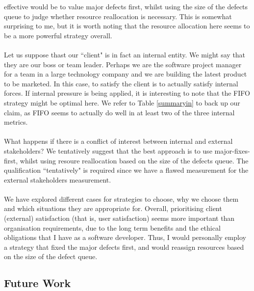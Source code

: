 effective would be to value major defects first, whilst using the size of the
defects queue to judge whether resource reallocation is necessary.
This is somewhat surprising to me, but it is worth noting that the resource
allocation here seems to be a more powerful strategy overall.\\
\\
Let us suppose thast our ``client" is in fact an internal entity.
We might say that they are our boss or team leader.
Perhaps we are the software project manager for a team in a large technology
company and we are building the latest product to be marketed.
In this case, to satisfy the client is to actually satisfy internal forces.
If internal pressure is being applied, it is interesting to note that the FIFO
strategy might be optimal here.
We refer to Table \ref{summaryin} to back up our claim, as FIFO seems to
actually do well in at least two of the three internal metrics.\\
\\
What happens if there is a conflict of interest between internal and external
stakeholders?
We tentatively suggest that the best approach is to use major-fixes-first,
   whilst using resoure reallocation based on the size of the defects queue.
The qualification ``tentatively" is required since we have a flawed measurement
for the external stakeholders measurement.\\
\\
We have explored different cases for strategies to choose, why we choose them
and which situations they are appropriate for.
Overall, prioritising client (external) satisfaction (that is, user
    satisfaction) seems more important than organisation requirements, due to
the long term benefits and the ethical obligations that I have as a software
developer.
Thus, I would personally employ a strategy that fixed the major defects first,
  and would reassign resources based on the size of the defect queue.

\subsection{Future Work}

